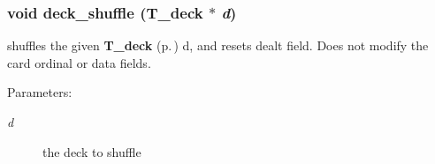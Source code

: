 \subsubsection{\setlength{\rightskip}{0pt plus 5cm}void deck\_\-shuffle ({\bf T\_\-deck} $\ast$ {\em d})}\label{group__deck_a2}


shuffles the given {\bf T\_\-deck} {\rm (p.\,\pageref{structT__deck})} d, and resets dealt field. Does not modify the card ordinal or data fields.

\begin{Desc}
\item[Parameters: ]\par
\begin{description}
\item[{\em 
d}]the deck to shuffle \end{description}
\end{Desc}
